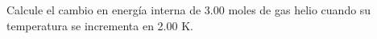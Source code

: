 \item Calcule el cambio en energía interna de 3.00 moles de gas helio cuando su temperatura se incrementa en 2.00 K.
